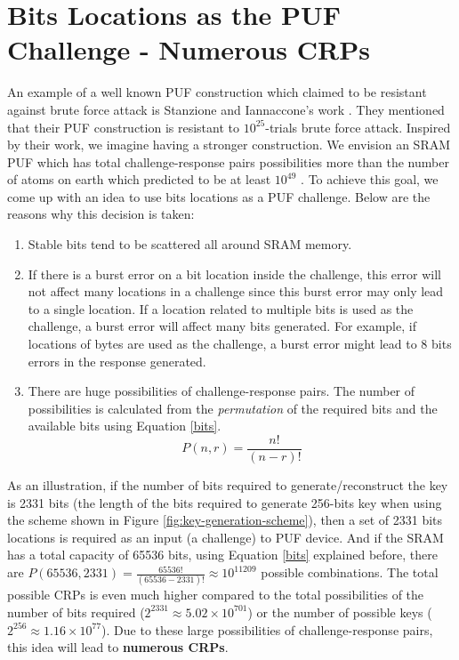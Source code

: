 \section{Bits Locations as the PUF Challenge - Numerous CRPs}
An example of a well known PUF construction which claimed to be resistant against brute force attack is Stanzione and Iannaccone's work \cite{Stanzione}. They mentioned that their PUF construction is resistant to $10^{25}$-trials brute force attack. Inspired by their work, we imagine having a stronger construction. We envision an SRAM PUF which has total challenge-response pairs possibilities more than the number of atoms on earth which predicted to be at least $10^{49}$ \cite{atoms_earth}. To achieve this goal, we come up with an idea to use bits locations as a PUF challenge.
Below are the reasons why this decision is taken:
\begin{enumerate}
    \item Stable bits tend to be scattered all around SRAM memory.
    \item If there is a burst error on a bit location inside the challenge, this error will not affect many locations in a challenge since this burst error may only lead to a single location. If a location related to multiple bits is used as the challenge, a burst error will affect many bits generated. For example, if locations of bytes are used as the challenge, a burst error might lead to 8 bits errors in the response generated.
    \item There are huge possibilities of challenge-response pairs. The number of possibilities is calculated from the \textit{permutation} of the required bits and the available bits using Equation \ref{bits}.
    \begin{equation}
        \label{bits}
        P(n,r)=\frac{n!}{\left( n-r \right) !}
    \end{equation}
\end{enumerate}
As an illustration, if the number of bits required to generate/reconstruct the key is 2331 bits (the length of the bits required to generate 256-bits key when using the scheme shown in Figure \ref{fig:key-generation-scheme}), then a set of 2331 bits locations is required as an input (a challenge) to PUF device. And if the SRAM has a total capacity of 65536 bits, using Equation \ref{bits} explained before, there are $P(65536, 2331)=\frac{65536!}{\left( 65536-2331 \right) !}\approx 10^{11209}$ possible combinations. The total possible CRPs is even much higher compared to the total possibilities of the number of bits required ($2^{2331}\approx5.02\times10^{701}$) or the number of possible keys ($2^{256}\approx1.16\times10^{77}$).
Due to these large possibilities of challenge-response pairs, this idea will lead to \textbf{numerous CRPs}.

